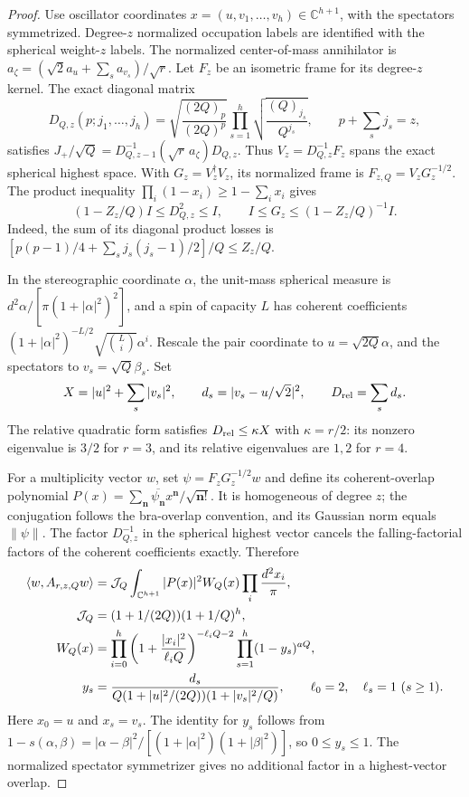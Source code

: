 \documentclass[11pt]{article}
\newcommand{\fall}[2]{(#1)_{#2}}
\begin{document}
\begin{proof}
Use oscillator coordinates $x=(u,v_1,\ldots,v_h)\in\mathbb C^{h+1}$,
with the spectators symmetrized. Degree-$z$ normalized occupation labels
are identified with the spherical weight-$z$ labels. The normalized
center-of-mass annihilator is
$a_\zeta=(\sqrt2a_u+\sum_sa_{v_s})/\sqrt r$.
Let $F_z$ be an isometric frame for its degree-$z$ kernel. The exact
diagonal matrix
\begin{equation}
 D_{Q,z}(p;j_1,\ldots,j_h)=
 \sqrt{\frac{\fall{2Q}p}{(2Q)^p}}
 \prod_{s=1}^h\sqrt{\frac{\fall Q{j_s}}{Q^{j_s}}},
 \qquad p+\sum_sj_s=z,
\end{equation}
satisfies $J_+/\sqrt Q=D_{Q,z-1}^{-1}(\sqrt r\,a_\zeta)D_{Q,z}$.
Thus $V_z=D_{Q,z}^{-1}F_z$ spans the exact spherical highest space.
With $G_z=V_z^\dagger V_z$, its normalized frame is
$F_{z,Q}=V_zG_z^{-1/2}$. The product inequality
$\prod_i(1-x_i)\ge1-\sum_ix_i$ gives
\begin{equation}\label{eq:opt-coh-gram}
 (1-Z_z/Q)I\le D_{Q,z}^2\le I,
 \qquad I\le G_z\le(1-Z_z/Q)^{-1}I.
\end{equation}
Indeed, the sum of its diagonal product losses is
$[p(p-1)/4+\sum_sj_s(j_s-1)/2]/Q\le Z_z/Q$.

In the stereographic coordinate $\alpha$, the unit-mass spherical measure
is $d^2\alpha/[\pi(1+|\alpha|^2)^2]$, and a spin of capacity $L$ has
coherent coefficients
$(1+|\alpha|^2)^{-L/2}\sqrt{\binom Li}\alpha^i$.
Rescale the pair coordinate to $u=\sqrt{2Q}\alpha$, and the spectators
to $v_s=\sqrt Q\beta_s$. Set
\begin{equation}
 X=|u|^2+\sum_s|v_s|^2,\qquad
 d_s=|v_s-u/\sqrt2|^2,\qquad D_{\rm rel}=\sum_sd_s.
\end{equation}
The relative quadratic form satisfies $D_{\rm rel}\le\kappa X$ with
$\kappa=r/2$: its nonzero eigenvalue is $3/2$ for $r=3$, and its relative
eigenvalues are $1,2$ for $r=4$.

For a multiplicity vector $w$, set $\psi=F_zG_z^{-1/2}w$ and define its
coherent-overlap polynomial
$P(x)=\sum_{\boldsymbol n}\overline{\psi_{\boldsymbol n}}
x^{\boldsymbol n}/\sqrt{\boldsymbol n!}$.
It is homogeneous of degree $z$; the conjugation follows the bra-overlap
convention, and its Gaussian norm equals $\|\psi\|$.
The factor $D_{Q,z}^{-1}$ in the spherical highest vector cancels the
falling-factorial factors of the coherent coefficients exactly. Therefore
\begin{align}
 \langle w,A_{r,z,Q}w\rangle
 &=\mathcal J_Q\int_{\mathbb C^{h+1}}|P(x)|^2W_Q(x)
                      \prod_i\frac{d^2x_i}{\pi},\\
 \mathcal J_Q&=(1+1/(2Q))(1+1/Q)^h,\notag\\
 W_Q(x)&=\prod_{i=0}^h
 \left(1+\frac{|x_i|^2}{\ell_iQ}\right)^{-\ell_iQ-2}
                  \prod_{s=1}^h(1-y_s)^{aQ},\notag\\
 y_s&=\frac{d_s}{Q(1+|u|^2/(2Q))(1+|v_s|^2/Q)},
 \qquad \ell_0=2,\quad\ell_s=1\ (s\ge1).\notag
\end{align}
Here $x_0=u$ and $x_s=v_s$. The identity for $y_s$ follows from
$1-s(\alpha,\beta)=|\alpha-\beta|^2/
[(1+|\alpha|^2)(1+|\beta|^2)]$, so $0\le y_s\le1$.
The normalized spectator symmetrizer gives no additional factor in a
highest-vector overlap.


\end{proof}
\end{document}
